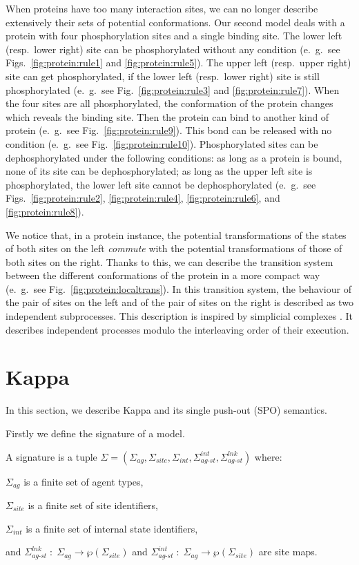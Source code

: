 \documentclass[10pt,a4paper]{llncs}
\newcommand{\statename}{\signaturesymb_{\textit{int}}}
\newcommand{\agentname}{\signaturesymb_{\textit{ag}}}
\newcommand{\sitename}{\signaturesymb_{\textit{site}}}
\newcommand{\linksite}{\signaturesymb^{\textit{lnk}}_{\textit{ag-st}}}
\newcommand{\statesite}{\signaturesymb^{\textit{int}}_{\textit{ag-st}}}
\newcommand{\signaturesymb}{\Sigma}
\newcommand{\signaturetuple}{(\agentname,\sitename,\statename,\statesite,\linksite)}
\newcommand{\eg}{e.~g.}
\newcommand{\beforesection}{\vspace*{-4pt}}
\renewcommand{\beforesection}{}
\begin{document}
When proteins have too many interaction sites, we can no longer describe extensively their sets of potential conformations. Our second model deals with a protein with four phosphorylation sites and a single binding site. The lower left  (resp.~lower right) site  can be phosphorylated without any condition (\eg~see Figs.~\ref{fig:protein:rule1} and \ref{fig:protein:rule5}). The upper left (resp.~upper right) site can get phosphorylated, if the lower left (resp.~lower right) site is still phosphorylated (\eg~see Fig.~\ref{fig:protein:rule3} and \ref{fig:protein:rule7}). When the four sites are all phosphorylated, the conformation of the protein changes which reveals the binding site. Then the protein can bind to another kind of protein (\eg~see Fig.~\ref{fig:protein:rule9}). This bond can be released with no condition (\eg~see Fig.~\ref{fig:protein:rule10}).  Phosphorylated sites can be dephosphorylated under the following conditions:
as long as a protein is bound, none of its site can be dephosphorylated;
as long as the upper left site is phosphorylated, the lower left site cannot be dephosphorylated (\eg~see Figs.~\ref{fig:protein:rule2}, \ref{fig:protein:rule4}, \ref{fig:protein:rule6}, and \ref{fig:protein:rule8}).

We notice that, in a protein instance,  the potential transformations of the states of both sites  on the left \emph{commute} with the potential transformations of those of both sites on the right. Thanks to this, we can  describe the transition system between the different conformations of the protein in a more compact way (\eg~see Fig.~\ref{fig:protein:localtrans}). In this transition system, the behaviour of  the pair of sites on the left and of the pair of sites on the right is described as two independent subprocesses.  This description is inspired by simplicial complexes \cite{DBLP:conf/concur/FajstrupGR98}.
It describes independent processes modulo the interleaving order of their execution.


\beforesection

\section{Kappa}
\label{sec:kappa}

\beforesection

In this section, we describe Kappa and its single push-out (SPO) semantics.


Firstly we define the signature of a model.
\begin{definition}
\label{def:signature}
A signature is a tuple $\signaturesymb=\signaturetuple$ where: \begin{inparaenum}\item $\agentname$ is a finite set of agent types, \item $\sitename$ is a finite set of site identifiers, \item $\statename$ is a finite set of internal state identifiers, \item and $\linksite\;:\;\agentname \rightarrow \wp(\sitename)$ and  $\statesite\;:\;\agentname \rightarrow \wp(\sitename)$ are site maps.
\end{inparaenum}\end{definition}
\end{document}
